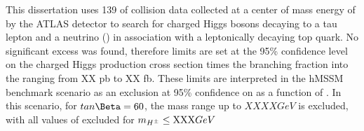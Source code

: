 

This dissertation uses 139 \ifb of \pp collision data collected at a center of mass energy of \sqs by the ATLAS detector to search for charged Higgs bosons decaying to a tau lepton and a neutrino (\HpLong) in association with a leptonically decaying top quark. No significant excess was found, therefore limits are set at the 95\% confidence level on the charged Higgs production cross section times the branching fraction into the \taunu ranging from XX pb to XX fb. These limits are interpreted in the hMSSM benchmark scenario as an exclusion at 95\% confidence on \tanb as a function of \mHp. In this scenario, for $\tanb=60$, the \Hp mass range up to $\unit{XXXX}{GeV}$ is excluded, with all values of \tanb excluded for $\mHp \leq \unit{XXX}{GeV}$
